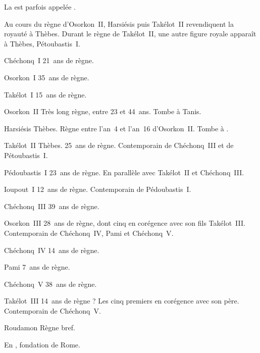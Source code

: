 La  est parfois appelée  .

Au cours du règne d’Osorkon~II, Harsiésis puis Takélot~II revendiquent 
la royauté à Thèbes. Durant le règne de Takélot~II, une autre figure 
royale apparaît à Thèbes, Pétoubastis~I\ier. 


\begin{listerois}
  \item [\XIIA{} Chéchonq~I\ier] \num{21}~ans de règne.
  \item [\XIIA{} Osorkon~I\ier] \num{35}~ans de règne.
  \item [\XIIA{} Takélot~I\ier] \num{15}~ans de règne.
  \item [\XIIA{} Osorkon~II] Très long règne, entre \num{23} et 
        \num{44}~ans. Tombe à Tanis.
  \item [\XIIB{} Harsiésis] Thèbes. Règne entre l'an~\num{4} et 
        l'an~\num{16} d'Osorkon~II. Tombe à \MH.
  \item [\XIIB{} Takélot~II] Thèbes. \num{25}~ans de règne. 
        Contemporain de Chéchonq~III et de Pétoubastis~I\ier.
  \item [\XIIC{} Pédoubastis~I\ier] \num{23}~ans de règne. 
        En parallèle avec \XIIB Takélot~II et \XIIA Chéchonq~III.
  \item [\XIIC{} Ioupout~I\ier] \num{12}~ans de règne. Contemporain de 
        Pédoubastis~I\ier.
  \item [\XIIA{} Chéchonq~III] \num{39}~ans de règne.
  \item [\XIIB{} Osorkon~III] \num{28}~ans de règne, dont cinq en 
        corégence avec son fils Takélot~III. 
        Contemporain de Chéchonq~IV, Pami et Chéchonq~V.
  \item [\XIIA{} Chéchonq~IV] \num{14}~ans de règne.
  \item [\XIIA{} Pami] \num{7}~ans de règne.
  \item [\XIIA{} Chéchonq~V] \num{38}~ans de règne.
  \item [\XIIB{} Takélot~III] \num{14}~ans de règne ? Les cinq 
        premiers en corégence avec son père. 
        Contemporain de Chéchonq~V.
  \item [\XIIB{} Roudamon] Règne bref.
\end{listerois}

En , fondation de Rome.

